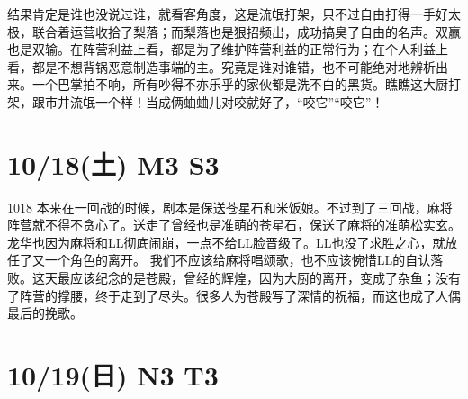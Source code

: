 结果肯定是谁也没说过谁，就看客角度，这是流氓打架，只不过自由打得一手好太极，联合着运营收拾了梨落；而梨落也是狠招频出，成功搞臭了自由的名声。双赢也是双输。在阵营利益上看，都是为了维护阵营利益的正常行为；在个人利益上看，都是不想背锅恶意制造事端的主。究竟是谁对谁错，也不可能绝对地辨析出来。一个巴掌拍不响，所有吵得不亦乐乎的家伙都是洗不白的黑货。瞧瞧这大厨打架，跟市井流氓一个样！当成俩蛐蛐儿对咬就好了，“咬它”“咬它”！

\section{10/18(土) M3 S3}


1018 本来在一回战的时候，剧本是保送苍星石和米饭娘。不过到了三回战，麻将阵营就不得不贪心了。送走了曾经也是准萌的苍星石，保送了麻将的准萌松实玄。龙华也因为麻将和LL彻底闹崩，一点不给LL脸晋级了。LL也没了求胜之心，就放任了又一个角色的离开。
我们不应该给麻将唱颂歌，也不应该惋惜LL的自认落败。这天最应该纪念的是苍殿，曾经的辉煌，因为大厨的离开，变成了杂鱼；没有了阵营的撑腰，终于走到了尽头。很多人为苍殿写了深情的祝福，而这也成了人偶最后的挽歌。

\section{10/19(日) N3 T3}

